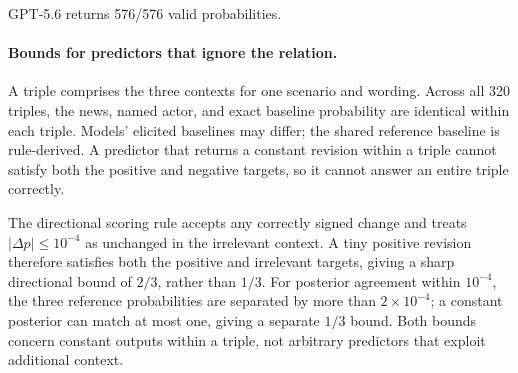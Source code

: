 GPT-5.6 returns 576/576 valid probabilities.

\begin{center}
\begin{minipage}{\linewidth}
\centering
{}
\label{tab:exp1-fresh-frontier}
\small

\end{minipage}
\end{center}

\begin{center}
\begin{minipage}{\linewidth}
\centering
{}
\label{tab:exp1-fresh-mechanisms}
\small

\end{minipage}
\end{center}

\clearpage
\paragraph{Bounds for predictors that ignore the relation.}
A triple comprises the three contexts for one scenario and wording. Across all
320 triples, the news, named actor, and exact baseline
probability are identical within each triple. Models' elicited baselines may differ; the shared reference baseline is rule-derived.
A predictor that returns a constant revision within a triple cannot satisfy both
the positive and negative targets, so it cannot answer an entire triple correctly.

The directional scoring rule accepts any correctly signed change and treats
$|\Delta p|\leq10^{-4}$ as unchanged in the irrelevant context. A tiny positive
revision therefore satisfies both the positive and irrelevant targets, giving a
sharp directional bound of $2/3$, rather than $1/3$. For posterior agreement
within $10^{-4}$, the three reference probabilities are separated by more than
$2\times10^{-4}$; a constant posterior can match at most one, giving a separate
$1/3$ bound. Both bounds concern constant outputs within a triple, not arbitrary
predictors that exploit additional context.

